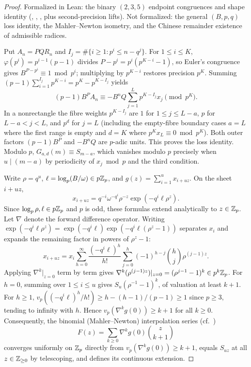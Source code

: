 \documentclass[11pt]{article}
\begin{document}
\begin{proof}
Formalized in Lean: the binary $(2,3,5)$ endpoint congruences and shape identity (, , , plus second-precision lifts). Not formalized: the general $(B,p,q)$ loss identity, the Mahler--Newton isometry, and the Chinese remainder existence of admissible radices.

Put $A_n=PQR_n$ and $I_j=\#\{i\ge1:p^i\le n-q^j\}$. For $1\le i\le K$, $\varphi(p^i)=p^{i-1}(p-1)$ divides $P-p^i=p^i(p^{K-i}-1)$, so Euler's congruence gives $B^{P-p^i}\equiv1\bmod p^i$; multiplying by $p^{K-i}$ restores precision $p^K$. Summing $(p-1)\sum_{i=1}^{I_j}p^{K-i}=p^K-p^{K-I_j}$ yields
\[
 (p-1)B^P A_n\equiv -B^n Q\sum_{j=1}^L p^{K-I_j}x_j\pmod{p^K}.
\]
In a nonrectangle the fibre weights $p^{K-I_j}$ are $1$ for $1\le j\le L-a$, $p$ for $L-a<j<L$, and $p^d$ for $j=L$ (including the empty-fibre boundary cases $a=L$ where the first range is empty and $d=K$ where $p^K x_L\equiv0\bmod p^K$). Both outer factors $(p-1)B^P$ and $-B^n Q$ are $p$-adic units. This proves the loss identity. Modulo $p$, $G_{a,d}(m)\equiv S_{m-a}$, which vanishes modulo $p$ precisely when $u\mid(m-a)$ by periodicity of $x_j\bmod p$ and the third condition.

Write $\rho=q^u$, $\ell=\log_p(B/\omega)\in p\mathbb Z_p$, and $g(z)=\sum_{i=1}^u x_{i+uz}$. On the sheet $i+uz$,
\[
 x_{i+uz}=q^{-i}\omega^{-q^i}\rho^{-z}\exp(-q^i\ell \rho^z).
\]
Since $\log_p \rho,\ell\in p\mathbb Z_p$ and $p$ is odd, these formulas extend analytically to $z\in\mathbb Z_p$. Let $\nabla$ denote the forward difference operator. Writing $\exp(-q^i\ell \rho^z)=\exp(-q^i\ell)\exp(-q^i\ell(\rho^z-1))$ separates $x_i$ and expands the remaining factor in powers of $\rho^z-1$:
\[
 x_{i+uz}=x_i\sum_{h=0}^\infty\frac{(-q^i\ell)^h}{h!}
          \sum_{j=0}^h(-1)^{h-j}\binom hj \rho^{(j-1)z}.
\]
Applying $\nabla^k|_{z=0}$ term by term gives $\nabla^k(\rho^{(j-1)z})|_{z=0}=(\rho^{j-1}-1)^k\in p^k\mathbb Z_p$. For $h=0$, summing over $1\le i\le u$ gives $S_u(\rho^{-1}-1)^k$, of valuation at least $k+1$. For $h\ge1$, $v_p((-q^i\ell)^h/h!)\ge h-(h-1)/(p-1)\ge1$ since $p\ge3$, tending to infinity with $h$. Hence $v_p(\nabla^k g(0))\ge k+1$ for all $k\ge0$. Consequently, the binomial (Mahler--Newton) interpolation series (cf.\ \cite{mahler,robert})
\[
 F(z)=\sum_{k\ge0}\nabla^k g(0)\binom z{k+1}
\]
converges uniformly on $\mathbb Z_p$ directly from $v_p(\nabla^k g(0))\ge k+1$, equals $S_{uz}$ at all $z\in\mathbb Z_{\ge0}$ by telescoping, and defines its continuous extension.


\end{proof}
\end{document}
